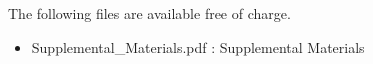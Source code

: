 \documentclass[journal=esthag,manuscript=article]{achemso}
\begin{document}
\begin{suppinfo}
The following files are available free of charge.
\begin{itemize}
  \item Supplemental\_Materials.pdf : Supplemental Materials
\end{itemize}
\end{suppinfo}




\end{document}
